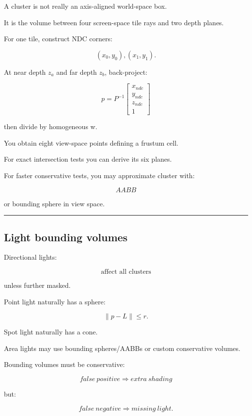 A cluster is not really an axis-aligned world-space box.

It is the volume between four screen-space tile rays and two depth planes.

For one tile, construct NDC corners:

\[
(x_0,y_0),(x_1,y_1).
\]

At near depth \(z_a\) and far depth \(z_b\), back-project:

\[
p=
P^{-1}
\begin{bmatrix}
x_{ndc}\\
y_{ndc}\\
z_{ndc}\\
1
\end{bmatrix}
\]

then divide by homogeneous w.

You obtain eight view-space points defining a frustum cell.

For exact intersection tests you can derive its six planes.

For faster conservative tests, you may approximate cluster with:

\[
AABB
\]

or bounding sphere in view space.

\begin{center}\rule{0.5\linewidth}{0.5pt}\end{center}

\subsection{Light bounding volumes}\label{04-visual-computing-ii-ch040-light-bounding-volumes}

Directional lights:

\[
\boxed{\text{affect all clusters}}
\]

unless further masked.

Point light naturally has a sphere:

\[
\|p-L\|\le r.
\]

Spot light naturally has a cone.

Area lights may use bounding spheres/AABBs or custom conservative volumes.

Bounding volumes must be conservative:

\[
\boxed{
false\ positive
\Rightarrow
extra\ shading
}
\]

but:

\[
\boxed{
false\ negative
\Rightarrow
missing\ light.
}
\]

